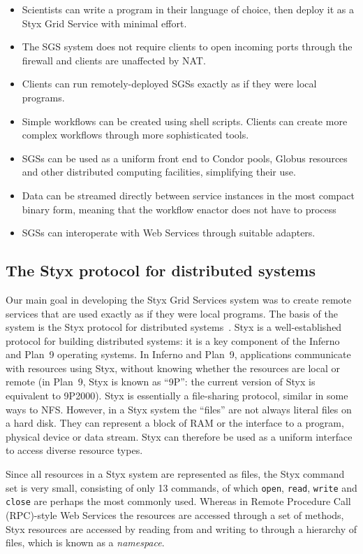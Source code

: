 \documentclass[a4paper]{article}
\begin{document}
\begin{itemize}
\item Scientists can write a program in their language of choice, then deploy it as a Styx Grid Service with minimal effort.
\item The SGS system does not require clients to open incoming ports through the firewall and clients are unaffected by NAT.
\item Clients can run remotely-deployed SGSs exactly as if they were local programs.
\item Simple workflows can be created using shell scripts.  Clients can create more complex workflows through more sophisticated tools.
\item SGSs can be used as a uniform front end to Condor pools, Globus resources and other distributed computing facilities, simplifying their use.
\item Data can be streamed directly between service instances in the most compact binary form, meaning that the workflow enactor does not have to process 
\item SGSs can interoperate with Web Services through suitable adapters.
\end{itemize}

\subsection{The Styx protocol for distributed systems}
Our main goal in developing the Styx Grid Services system was to create remote services that are used exactly as if they were local programs.  The basis of the system is the Styx protocol for distributed systems~\cite{Pike:1999}.  Styx is a well-established protocol for building distributed systems: it is a key component of the Inferno \cite{Inferno} and Plan~9 \cite{Plan9} operating systems.  In Inferno and Plan~9, applications communicate with resources using Styx, without knowing whether the resources are local or remote (in Plan~9, Styx is known as ``9P'': the current version of Styx is equivalent to 9P2000).  Styx is essentially a file-sharing protocol, similar in some ways to NFS.  However, in a Styx system the ``files'' are not always literal files on a hard disk.  They can represent a block of RAM or the interface to a program, physical device or data stream.  Styx can therefore be used as a uniform interface to access diverse resource types.

Since all resources in a Styx system are represented as files, the Styx command set is very small, consisting of only 13 commands, of which \texttt{open}, \texttt{read}, \texttt{write} and \texttt{close} are perhaps the most commonly used.  Whereas in Remote Procedure Call (RPC)-style Web Services the resources are accessed through a set of methods, Styx resources are accessed by reading from and writing to through a hierarchy of files, which is known as a \textit{namespace\/}.
\end{document}
